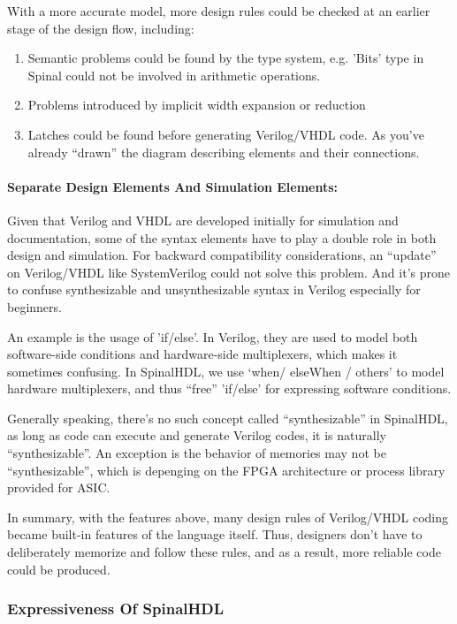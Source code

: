 \documentclass{article}
\begin{document}
With a more accurate model, more design rules could be checked at an earlier stage of the design flow, including:

\begin{enumerate}
\item Semantic problems could be found by the type system, e.g. 'Bits' type in Spinal could not be involved in arithmetic operations.
\item Problems introduced by implicit width expansion or reduction
\item Latches could be found before generating Verilog/VHDL code. As you’ve already “drawn” the diagram describing elements and their connections.
\end{enumerate}

 \paragraph{\textbf{Separate Design Elements And Simulation Elements:}}

Given that Verilog and VHDL are developed initially for simulation and documentation, some of the syntax elements have to play a double role in both design and simulation. For backward compatibility considerations, an “update” on Verilog/VHDL like SystemVerilog could not solve this problem. And it’s prone to confuse synthesizable and unsynthesizable syntax in Verilog especially for beginners. 

An example is the usage of 'if/else'. In Verilog, they are used to model both software-side conditions and hardware-side multiplexers, which makes it sometimes confusing. In SpinalHDL, we use ‘when/ elseWhen / others' to model hardware multiplexers, and thus “free” 'if/else' for expressing software conditions. 

Generally speaking, there’s no such concept called “synthesizable” in SpinalHDL, as long as code can execute and generate Verilog codes, it is naturally “synthesizable”. An exception is the behavior of memories may not be “synthesizable”, which is depenging on the FPGA architecture or process library provided for ASIC.

In summary, with the features above, many design rules of Verilog/VHDL coding became built-in features of the language itself. Thus, designers don't have to deliberately memorize and follow these rules, and as a result, more reliable code could be produced.


\subsubsection{Expressiveness Of SpinalHDL}
\end{document}
